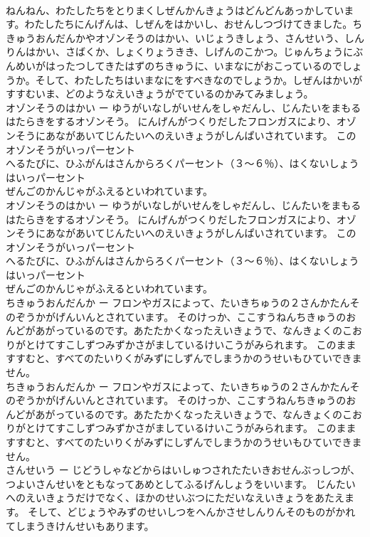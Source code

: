 \documentclass[8pt]{extreport}
\begin{document}
\begin{CJK}{UTF8}{min}
\\	ねんねん、わたしたちをとりまくしぜんかんきょうはどんどんあっかしています。わたしたちにんげんは、しぜんをはかいし、おせんしつづけてきました。ちきゅうおんだんかやオゾンそうのはかい、いじょうきしょう、さんせいう、しんりんはかい、さばくか、しょくりょうきき、しげんのこかつ。じゅんちょうにぶんめいがはったつしてきたはずのちきゅうに、いまなにがおこっているのでしょうか。そして、わたしたちはいまなにをすべきなのでしょうか。しぜんはかいがすすむいま、どのようなえいきょうがでているのかみてみましょう。 
\\	オゾンそうのはかい ー ゆうがいなしがいせんをしゃだんし、じんたいをまもるはたらきをするオゾンそう。 にんげんがつくりだしたフロンガスにより、オゾンそうにあながあいてじんたいへのえいきょうがしんぱいされています。 このオゾンそうがいっパーセント
\\	へるたびに、ひふがんはさんからろくパーセント（３〜６％）、はくないしょうはいっパーセント
\\	ぜんごのかんじゃがふえるといわれています。	
\\	オゾンそうのはかい ー ゆうがいなしがいせんをしゃだんし、じんたいをまもるはたらきをするオゾンそう。 にんげんがつくりだしたフロンガスにより、オゾンそうにあながあいてじんたいへのえいきょうがしんぱいされています。 このオゾンそうがいっパーセント
\\	へるたびに、ひふがんはさんからろくパーセント（３〜６％）、はくないしょうはいっパーセント
\\	ぜんごのかんじゃがふえるといわれています。 
\\	ちきゅうおんだんか ー フロンやガスによって、たいきちゅうの２さんかたんそのぞうかがげんいんとされています。 そのけっか、ここすうねんちきゅうのおんどがあがっているのです。あたたかくなったえいきょうで、なんきょくのこおりがとけてすこしずつみずかさがましているけいこうがみられます。 このまますすむと、すべてのたいりくがみずにしずんでしまうかのうせいもひていできません。	
\\	ちきゅうおんだんか ー フロンやガスによって、たいきちゅうの２さんかたんそのぞうかがげんいんとされています。 そのけっか、ここすうねんちきゅうのおんどがあがっているのです。あたたかくなったえいきょうで、なんきょくのこおりがとけてすこしずつみずかさがましているけいこうがみられます。 このまますすむと、すべてのたいりくがみずにしずんでしまうかのうせいもひていできません。 
\\	さんせいう ー じどうしゃなどからはいしゅつされたたいきおせんぶっしつが、つよいさんせいをともなってあめとしてふるげんしょうをいいます。 じんたいへのえいきょうだけでなく、ほかのせいぶつにただいなえいきょうをあたえます。 そして、どじょうやみずのせいしつをへんかさせしんりんそのものがかれてしまうきけんせいもあります。	

\end{CJK}
\end{document}
